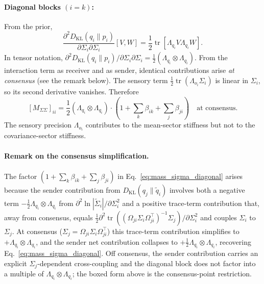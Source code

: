 \documentclass[11pt]{article}
\begin{document}
\paragraph{Diagonal blocks $(i = k)$:} From the prior,
\begin{equation}
\frac{\partial^2 D_{\mathrm{KL}}(q_i \| p_i)}{\partial \Sigma_i \partial \Sigma_i}[V, W] = \frac{1}{2}\operatorname{tr}[\Lambda_{q_i} V \Lambda_{q_i} W].
\end{equation}
In tensor notation, $\partial^2 D_{\mathrm{KL}}(q_i \| p_i)/\partial \Sigma_i \partial \Sigma_i = \frac{1}{2}(\Lambda_{q_i} \otimes \Lambda_{q_i})$. From the interaction term as receiver and as sender, identical contributions arise \emph{at consensus} (see the remark below). The sensory term $\frac{1}{2}\operatorname{tr}(\Lambda_{o_i}\Sigma_i)$ is linear in $\Sigma_i$, so its second derivative vanishes. Therefore
\begin{equation}
\boxed{[M_{\Sigma\Sigma}]_{ii} = \frac{1}{2}(\Lambda_{q_i} \otimes \Lambda_{q_i}) \cdot \left(1 + \sum_k \beta_{ik} + \sum_j \beta_{ji}\right) \quad \text{at consensus.}}
\label{eq:mass_sigma_diagonal}
\end{equation}
The sensory precision $\Lambda_{o_i}$ contributes to the mean-sector stiffness but not to the covariance-sector stiffness.

\paragraph{Remark on the consensus simplification.} The factor $(1 + \sum_k \beta_{ik} + \sum_j \beta_{ji})$ in Eq.~\eqref{eq:mass_sigma_diagonal} arises because the sender contribution from $D_{\mathrm{KL}}(q_j \| \tilde{q}_i)$ involves both a negative term $-\frac{1}{2}\Lambda_{q_i} \otimes \Lambda_{q_i}$ from $\partial^2 \ln |\tilde{\Sigma}_i|/\partial \Sigma_i^2$ and a positive trace-term contribution that, away from consensus, equals $\frac{1}{2}\partial^2 \operatorname{tr}((\Omega_{ji}\Sigma_i\Omega_{ji}^\top)^{-1}\Sigma_j)/\partial\Sigma_i^2$ and couples $\Sigma_i$ to $\Sigma_j$. At consensus ($\Sigma_j = \Omega_{ji}\Sigma_i\Omega_{ji}^\top$) this trace-term contribution simplifies to $+\Lambda_{q_i} \otimes \Lambda_{q_i}$, and the sender net contribution collapses to $+\frac{1}{2}\Lambda_{q_i}\otimes\Lambda_{q_i}$, recovering Eq.~\eqref{eq:mass_sigma_diagonal}. Off consensus, the sender contribution carries an explicit $\Sigma_j$-dependent cross-coupling and the diagonal block does not factor into a multiple of $\Lambda_{q_i}\otimes\Lambda_{q_i}$; the boxed form above is the consensus-point restriction.
\end{document}
